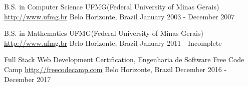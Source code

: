 

\begin{cventries}
    
  \cventry
    {B.S. in Computer Science} %
    {UFMG(Federal University of Minas Gerais)} %
    {\href{http://www.ufmg.br}{http://www.ufmg.br}}
    {Belo Horizonte, Brazil} %
    {January 2003 - December 2007} %

  \cventry
    {B.S. in Mathematics} %
    {UFMG(Federal University of Minas Gerais)} %
    {\href{http://www.ufmg.br}{http://www.ufmg.br}}
    {Belo Horizonte, Brazil} %
    {January 2011 - Incomplete} %
    
  \cventry
    {Full Stack Web Development Certification, Engenharia de Software} %
    {Free Code Camp} %
    {\href{http://freecodecamp.com}{http://freecodecamp.com}}
    {Belo Horizonte, Brazil} %
    {December 2016 - December 2017} %
\end{cventries}
